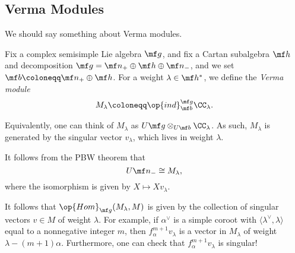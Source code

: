 \documentclass[../notes.tex]{subfiles}
\begin{document}
\subsection{Verma Modules}
We should say something about Verma modules.
\begin{definition}
	Fix a complex semisimple Lie algebra $\mf g$, and fix a Cartan subalgebra $\mf h$ and decomposition $\mf g=\mf n_+\oplus\mf h\oplus\mf n_-$, and we set $\mf b\coloneqq\mf n_+\oplus\mf h$. For a weight $\lambda\in\mf h^*$, we define the \textit{Verma module}
	\[M_\lambda\coloneqq\op{ind}_{\mf b}^{\mf g}\CC_\lambda.\]
\end{definition}
\begin{remark}
	Equivalently, one can think of $M_\lambda$ as $U\mf g\otimes_{U\mf b}\CC_\lambda$. As such, $M_\lambda$ is generated by the singular vector $v_\lambda$, which lives in weight $\lambda$.
\end{remark}
\begin{remark}
	It follows from the PBW theorem that
	\[U\mf n_-\cong M_\lambda,\]
	where the isomorphism is given by $X\mapsto Xv_\lambda$.
\end{remark}
\begin{remark}
	It follows that $\op{Hom}_{\mf g}(M_\lambda,M)$ is given by the collection of singular vectors $v\in M$ of weight $\lambda$. For example, if $\alpha^\lor$ is a simple coroot with $\langle\lambda^\lor,\lambda\rangle$ equal to a nonnegative integer $m$, then $f_\alpha^{m+1}v_\lambda$ is a vector in $M_\lambda$ of weight $\lambda-(m+1)\alpha$. Furthermore, one can check that $f_\alpha^{m+1}v_\lambda$ is singular!
\end{remark}
\end{document}

